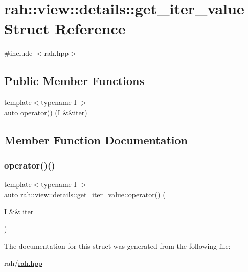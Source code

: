 \hypertarget{structrah_1_1view_1_1details_1_1get__iter__value}{}\section{rah\+::view\+::details\+::get\+\_\+iter\+\_\+value Struct Reference}
\label{structrah_1_1view_1_1details_1_1get__iter__value}


{\ttfamily \#include $<$rah.\+hpp$>$}

\subsection*{Public Member Functions}
\begin{DoxyCompactItemize}
\item 
{\footnotesize template$<$typename I $>$ }\\auto \mbox{\hyperlink{structrah_1_1view_1_1details_1_1get__iter__value_a22f5c2b5c4405adbf6f7e786e776f315}{operator()}} (I \&\&iter)
\end{DoxyCompactItemize}


\subsection{Member Function Documentation}
\mbox{\label{structrah_1_1view_1_1details_1_1get__iter__value_a22f5c2b5c4405adbf6f7e786e776f315}} 
\subsubsection{\texorpdfstring{operator()()}{operator()()}}
{\footnotesize\ttfamily template$<$typename I $>$ \\
auto rah\+::view\+::details\+::get\+\_\+iter\+\_\+value\+::operator() (\begin{DoxyParamCaption}\item[{I \&\&}]{iter }\end{DoxyParamCaption})\hspace{0.3cm}{\ttfamily [inline]}}



The documentation for this struct was generated from the following file\+:\begin{DoxyCompactItemize}
\item 
rah/\mbox{\hyperlink{rah_8hpp}{rah.\+hpp}}\end{DoxyCompactItemize}
